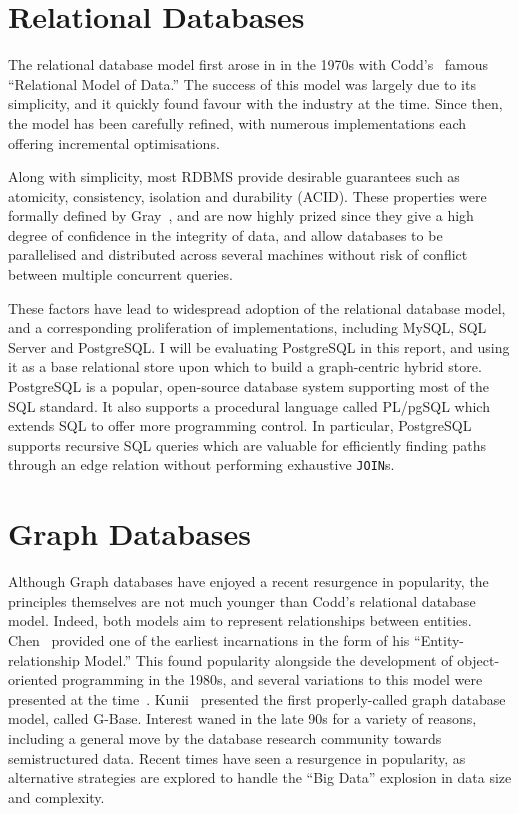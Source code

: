 \section{Relational Databases}

The relational database model first arose in in the 1970s with
Codd's~\cite{Codd} famous ``Relational Model of Data.'' The success of this
model was largely due to its simplicity, and it quickly found favour with the
industry at the time. Since then, the model has been carefully refined, with
numerous implementations each offering incremental optimisations.

Along with simplicity, most RDBMS provide desirable guarantees such as
atomicity, consistency, isolation and durability (ACID). These properties were
formally defined by Gray~\cite{gray1981transaction}, and are now highly prized
since they give a high degree of confidence in the integrity of data, and
allow databases to be parallelised and distributed across several machines
without risk of conflict between multiple concurrent queries.

These factors have lead to widespread adoption of the relational database
model,  and a corresponding proliferation of implementations, including MySQL,
SQL Server and PostgreSQL. I will be evaluating PostgreSQL in this report, and
using it as a base relational store upon which to build a graph-centric hybrid
store. PostgreSQL is a popular, open-source database system supporting most of
the SQL standard. It also supports a procedural language called PL/pgSQL which
extends SQL to offer more programming control. In particular, PostgreSQL
supports recursive SQL queries which are valuable for efficiently finding
paths through an edge relation without performing exhaustive \texttt{JOIN}s.

\section{Graph Databases}

Although Graph databases have enjoyed a recent resurgence in popularity, the
principles themselves are not much younger than Codd's relational database
model. Indeed, both models aim to represent relationships between entities.
Chen~\cite{Chen} provided one of the earliest incarnations in the form of his
``Entity-relationship Model.'' This found popularity alongside the development
of object-oriented programming in the 1980s, and several variations to this
model were presented at the time~\cite{Kim}\cite{Abiteboul}.
Kunii~\cite{Kunii:1987:DGD:42040.42071} presented the first properly-called
graph database model, called G-Base. Interest waned in the late 90s for a
variety of reasons, including a general move by the database research
community towards semistructured data. Recent times have seen a resurgence in
popularity, as alternative strategies are explored to handle the ``Big Data''
explosion in data size and complexity.

